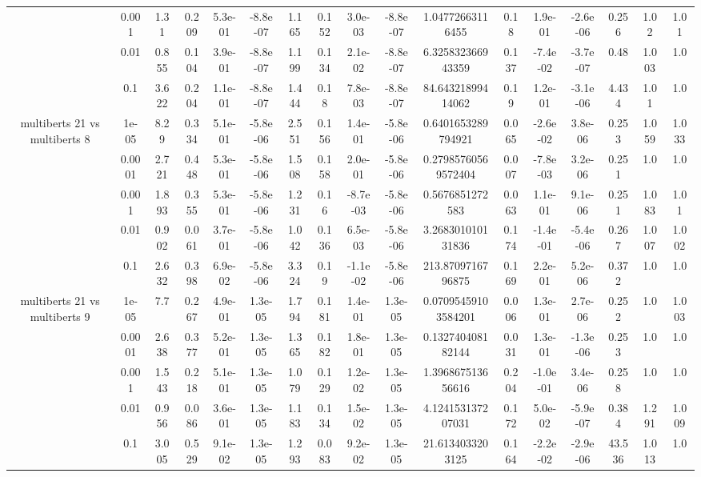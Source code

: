 \begin{tabular}{|c|c|c|c|c|c|c|c|c|c|c|c|c|c|c|c|c|}
 & 0.001 & 1.31 & 0.209 & 5.3e-01 & -8.8e-07 & 1.165 & 0.152 & 3.0e-03 & -8.8e-07 & 1.04772663116455 & 0.18 & 1.9e-01 & -2.6e-06 & 0.256 & 1.02 & 1.01 \\
 & 0.01 & 0.855 & 0.104 & 3.9e-01 & -8.8e-07 & 1.199 & 0.134 & 2.1e-02 & -8.8e-07 & 6.325832366943359 & 0.137 & -7.4e-02 & -3.7e-07 & 0.48 & 1.003 & 1.0 \\
 & 0.1 & 3.622 & 0.204 & 1.1e-01 & -8.8e-07 & 1.444 & 0.18 & 7.8e-03 & -8.8e-07 & 84.64321899414062 & 0.19 & 1.2e-01 & -3.1e-06 & 4.434 & 1.01 & 1.0 \\
\hline
\multirow{5}{*}{multiberts 21 vs multiberts 8} & 1e-05 & 8.29 & 0.334 & 5.1e-01 & -5.8e-06 & 2.551 & 0.156 & 1.4e-01 & -5.8e-06 & 0.6401653289794921 & 0.065 & -2.6e-02 & 3.8e-06 & 0.253 & 1.059 & 1.033 \\
 & 0.0001 & 2.721 & 0.448 & 5.3e-01 & -5.8e-06 & 1.508 & 0.158 & 2.0e-01 & -5.8e-06 & 0.27985760569572404 & 0.007 & -7.8e-03 & 3.2e-06 & 0.251 & 1.0 & 1.0 \\
 & 0.001 & 1.893 & 0.355 & 5.3e-01 & -5.8e-06 & 1.231 & 0.16 & -8.7e-03 & -5.8e-06 & 0.5676851272583 & 0.063 & 1.1e-01 & 9.1e-06 & 0.251 & 1.083 & 1.01 \\
 & 0.01 & 0.902 & 0.061 & 3.7e-01 & -5.8e-06 & 1.042 & 0.136 & 6.5e-03 & -5.8e-06 & 3.268301010131836 & 0.174 & -1.4e-01 & -5.4e-06 & 0.267 & 1.007 & 1.002 \\
 & 0.1 & 2.632 & 0.398 & 6.9e-02 & -5.8e-06 & 3.324 & 0.19 & -1.1e-02 & -5.8e-06 & 213.8709716796875 & 0.169 & 2.2e-01 & 5.2e-06 & 0.372 & 1.0 & 1.0 \\
\hline
\multirow{5}{*}{multiberts 21 vs multiberts 9} & 1e-05 & 7.7 & 0.267 & 4.9e-01 & 1.3e-05 & 1.794 & 0.181 & 1.4e-01 & 1.3e-05 & 0.07095459103584201 & 0.006 & 1.3e-01 & 2.7e-06 & 0.252 & 1.0 & 1.003 \\
 & 0.0001 & 2.638 & 0.377 & 5.2e-01 & 1.3e-05 & 1.365 & 0.182 & 1.8e-01 & 1.3e-05 & 0.132740408182144 & 0.031 & 1.3e-01 & -1.3e-06 & 0.253 & 1.0 & 1.0 \\
 & 0.001 & 1.543 & 0.218 & 5.1e-01 & 1.3e-05 & 1.079 & 0.129 & 1.2e-02 & 1.3e-05 & 1.396867513656616 & 0.204 & -1.0e-01 & 3.4e-06 & 0.258 & 1.0 & 1.0 \\
 & 0.01 & 0.956 & 0.086 & 3.6e-01 & 1.3e-05 & 1.183 & 0.134 & 1.5e-02 & 1.3e-05 & 4.124153137207031 & 0.172 & 5.0e-02 & -5.9e-07 & 0.384 & 1.291 & 1.009 \\
 & 0.1 & 3.005 & 0.529 & 9.1e-02 & 1.3e-05 & 1.293 & 0.083 & 9.2e-02 & 1.3e-05 & 21.6134033203125 & 0.164 & -2.2e-02 & -2.9e-06 & 43.536 & 1.013 & 1.0 \\

\end{tabular}
